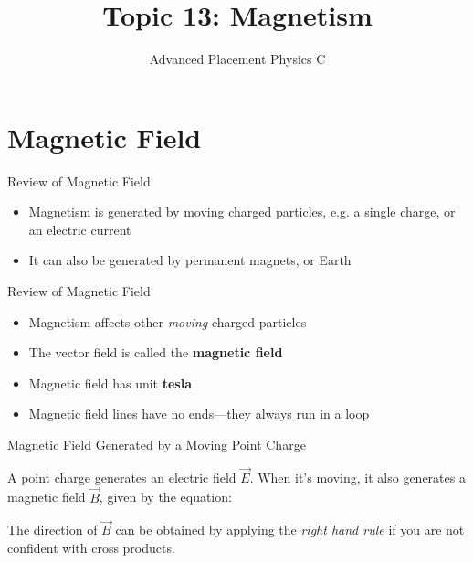 \documentclass[12pt,aspectratio=169]{beamer}
\title{Topic 13: Magnetism}
\subtitle{Advanced Placement Physics C}
\begin{document}
\begin{frame}
  \maketitle
\end{frame}


\section{Magnetic Field}

\begin{frame}{Review of Magnetic Field}
  \begin{itemize}
  \item Magnetism is generated by moving charged particles, e.g.
    a single charge, or an electric current
  \item It can also be generated by permanent magnets, or Earth
  \end{itemize}
\end{frame}



\begin{frame}{Review of Magnetic Field}
  \begin{itemize}
  \item Magnetism affects other \emph{moving} charged particles
  \item The vector field is called the \textbf{magnetic field}
  \item Magnetic field has unit \textbf{tesla}
  \item Magnetic field lines have no ends---they always run in a loop
  \end{itemize}
\end{frame}



\begin{frame}{Magnetic Field Generated by a Moving Point Charge}
  \begin{center}
  \end{center}
  A point charge generates an electric field $\vec E$. When it's moving, it
  also generates a magnetic field $\vec B$, given by the equation:


  The direction of $\vec B$ can be obtained by applying the
  \emph{right hand rule} if you are not confident with cross products.
\end{frame}
\end{document}
